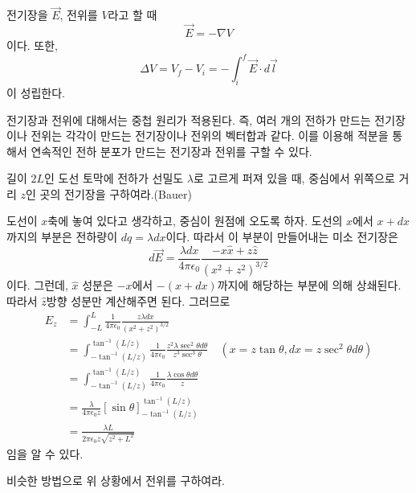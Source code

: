 \begin{theorem}
전기장을 $\vec{E}$, 전위를 $V$라고 할 때
\begin{equation}
\vec{E} = -\nabla V
\end{equation}
이다. 또한, 
\begin{equation}
\Delta V = V_f - V_i = -\int_i ^ f \vec{E} \cdot d\vec{l}
\end{equation}
이 성립한다.
\end{theorem}
전기장과 전위에 대해서는 중첩 원리가 적용된다. 즉, 여러 개의 전하가 만드는 전기장이나 전위는 각각이 만드는 전기장이나 전위의 벡터합과 같다. 이를 이용해 적분을 통해서 연속적인 전하 분포가 만드는 전기장과 전위를 구할 수 있다.
\begin{example}
길이 $2L$인 도선 토막에 전하가 선밀도 $\lambda$로 고르게 퍼져 있을 때, 중심에서 위쪽으로 거리 $z$인 곳의 전기장을 구하여라.(Bauer)
\end{example}
도선이 $x$축에 놓여 있다고 생각하고, 중심이 원점에 오도록 하자. 도선의 $x$에서 $x+dx$까지의 부분은 전하량이 $dq = \lambda dx$이다. 따라서 이 부분이 만들어내는 미소 전기장은 
\begin{equation}
d\vec{E}=\frac{\lambda dx}{4\pi\epsilon_0}\frac{-x\hat{x}+z\hat{z}}{(x^2+z^2)^{3/2}}
\end{equation}
이다. 그런데, $\hat{x}$ 성분은 $-x$에서 $-(x+dx)$까지에 해당하는 부분에 의해 상쇄된다. 따라서 $\hat{z}$방향 성분만 계산해주면 된다. 그러므로
\begin{align}
E_z &= \int_{-L}^L \frac{1}{4\pi\epsilon_0}\frac{z\lambda dx}{(x^2+z^2)^{3/2}}\\
&=\int_{-\tan^{-1}(L/z)}^{\tan^{-1}(L/z)} \frac{1}{4\pi\epsilon_0}\frac{z^2\lambda\sec^2 \theta d\theta }{z^3 \sec^3 \theta} \quad(x=z\tan\theta, dx=z\sec^2\theta d\theta)\\
&= \int_{-\tan^{-1}(L/z)}^{\tan^{-1}(L/z)} \frac{1}{4\pi\epsilon_0}\frac{\lambda\cos \theta d\theta }{z}\\
&=\frac{\lambda}{4\pi\epsilon_0z}[\sin\theta]_{-\tan^{-1}(L/z)}^{\tan^{-1}(L/z)} \\
&= \frac{\lambda L}{2\pi\epsilon_0z\sqrt{z^2+L^2}{}}
\end{align}
임을 알 수 있다. \\
\begin{exercise}
비슷한 방법으로 위 상황에서 전위를 구하여라.
\end{exercise}

